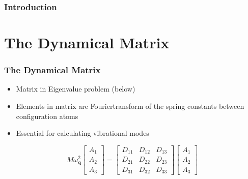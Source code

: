 \documentclass[hyperref={colorlinks=true,urlcolor=blue,linkcolor=.},aspectratio=1610,mathserif]{beamer}
\begin{document}
\begin{frame}
\begin{columns}[T]
 \end{columns}
\end{frame}

\begin{frame}
 \frametitle{Introduction}
\end{frame}

\section{The Dynamical Matrix}

\begin{frame}
 \frametitle{The Dynamical Matrix}
 \begin{itemize}[<+->]
  \pause
  \item Matrix in Eigenvalue problem (below)
  \item Elements in matrix are Fouriertransform of the spring constants between configuration atoms
  \item Essential for calculating vibrational modes
 \end{itemize}
 \begin{equation}
  M\omega_{\mathbf{q}}^{2}
  \begin{bmatrix}
   A_{1} \\
   A_{2} \\
   A_{3}
  \end{bmatrix}
  =
  \begin{bmatrix}
   D_{11} & D_{12} & D_{13} \\
   D_{21} & D_{22} & D_{23} \\
   D_{31} & D_{32} & D_{33}
  \end{bmatrix}\begin{bmatrix}
   A_{1} \\
   A_{2} \\
   A_{3}
  \end{bmatrix} \nonumber
 \end{equation}
\end{frame}
\end{document}

